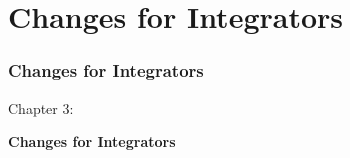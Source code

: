 %

\section{Changes for Integrators}
\begin{frame}[fragile]
	\frametitle{Changes for Integrators}

	\begin{center}\huge{Chapter 3:}\end{center}
	\begin{center}\huge{\color{typo3darkgrey}\textbf{Changes for Integrators}}\end{center}

\end{frame}


